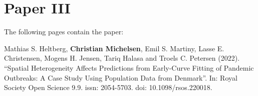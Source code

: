 \chapter{Paper III}
\label{chapter:covid19-agent-based-model}

The following pages contain the paper:
\vspace*{1cm}


Mathias S. Heltberg, \textbf{Christian Michelsen}, Emil S. Martiny, Lasse E. Christensen, Mogens H. Jensen, Tariq Halasa and Troels C. Petersen (2022). ``Spatial Heterogeneity Affects Predictions from Early-Curve Fitting of Pandemic Outbreaks: A Case Study Using Population Data from Denmark''. In: Royal Society Open Science 9.9. issn: 2054-5703. doi: 10.1098/rsos.220018.

% 